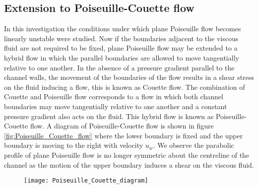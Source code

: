 \documentclass[a4paper, 12pt, twoside, openright]{article}
\numberwithin{equation}{section}
\begin{document}
\subsection{Extension to Poiseuille-Couette flow}
In this investigation the conditions under which plane Poiseuille flow becomes linearly unstable were studied. Now if the boundaries adjacent to the viscous fluid are not required to be fixed, plane Poiseuille flow may be extended to a hybrid flow in which the parallel boundaries are allowed to move tangentially relative to one another. In the absence of a pressure gradient parallel to the channel walls, the movement of the boundaries of the flow results in a shear stress on the fluid inducing a flow, this is known as Couette flow. The combination of Couette and Poiseuille flow corresponds to a flow in which both channel boundaries may move tangentially relative to one another and a constant pressure gradient also acts on the fluid. This hybrid flow is known as Poiseuille-Couette flow. A diagram of Poiseuille-Couette flow is shown in figure \ref{fig:Poiseuille_Couette_flow} where the lower boundary is fixed and the upper boundary is moving to the right with velocity $u_w$. We observe the parabolic profile of plane Poiseuille flow is no longer symmetric about the centreline of the channel as the motion of the upper boundary induces a shear on the viscous fluid. 
\begin{figure}[H]
\centering
\texttt{[image: Poiseuille\_Couette\_diagram]}
\end{figure}
\end{document}
